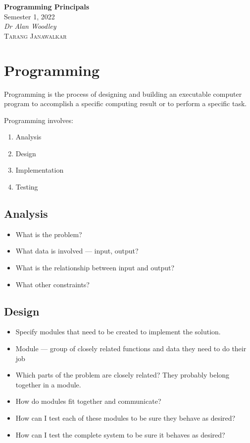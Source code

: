\documentclass{article}
\date{}
\newcommand{\unitName}{Programming Principals}
\newcommand{\unitTime}{Semester 1, 2022}
\newcommand{\unitCoordinator}{Dr Alan Woodley}
\newcommand{\documentAuthors}{\textsc{Tarang Janawalkar}}
\begin{document}
%
\begin{titlepage}
    \vspace*{\fill}
    \begin{center}
        \LARGE{\textbf{\unitName}} \\[0.1in]
        \normalsize{\unitTime} \\[0.2in]
        \normalsize\textit{\unitCoordinator} \\[0.2in]
        \documentAuthors
    \end{center}
    \vspace*{\fill}
    \doclicenseThis
    \thispagestyle{empty}
\end{titlepage}
\newpage
%
\tableofcontents
\newpage
%
\lstset{language=[Sharp]C}
\section{Programming}
\begin{definition}
    Programming is the process of designing and building an executable
    computer program to accomplish a specific computing result or to
    perform a specific task.
\end{definition}
Programming involves:
\begin{enumerate}
    \item Analysis
    \item Design
    \item Implementation
    \item Testing
\end{enumerate}
\subsection{Analysis}
\begin{itemize}
    \item What is the problem?
    \item What data is involved --- input, output?
    \item What is the relationship between input and output?
    \item What other constraints?
\end{itemize}
\subsection{Design}
\begin{itemize}
    \item Specify modules that need to be created to implement the solution.
    \item Module --- group of closely related functions and data they need to do their job
    \item Which parts of the problem are closely related? They probably belong together in a module.
    \item How do modules fit together and communicate?
    \item How can I test each of these modules to be sure they behave as desired?
    \item How can I test the complete system to be sure it behaves as desired?
\end{itemize}
\end{document}
